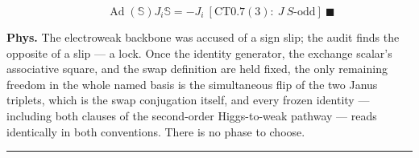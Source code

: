 \begin{theorem}
\[
\qquad \operatorname{Ad}(\mathbb S)J_i\mathbb S=-J_i\ [\mathrm{CT0.7}(3):\ J\ S\text{-odd}]\ \blacksquare
\]

\textbf{Phys.} The electroweak backbone was accused of a sign slip; the audit finds the opposite of a slip — a lock. Once the identity generator, the exchange scalar's associative square, and the swap definition are held fixed, the only remaining freedom in the whole named basis is the simultaneous flip of the two Janus triplets, which is the swap conjugation itself, and every frozen identity — including both clauses of the second-order Higgs-to-weak pathway — reads identically in both conventions. There is no phase to choose.

\vspace{2pt}\noindent\rule{\textwidth}{0.4pt}\vspace{2pt}

\end{theorem}

